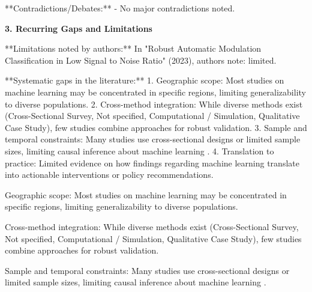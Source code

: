 \documentclass[11pt,a4paper]{article}
\begin{document}
**Contradictions/Debates:**
- No major contradictions noted.

\vspace{1em}


\textbf{\large 3. Recurring Gaps and Limitations}\par\vspace{0.5em}

**Limitations noted by authors:**
In "Robust Automatic Modulation Classification in Low Signal to Noise Ratio" (2023), authors note: limited.

**Systematic gaps in the literature:**
1. Geographic scope: Most studies on machine learning  may be concentrated in specific regions, limiting generalizability to diverse populations.
2. Cross-method integration: While diverse methods exist (Cross-Sectional Survey, Not specified, Computational / Simulation, Qualitative Case Study), few studies combine approaches for robust validation.
3. Sample and temporal constraints: Many studies use cross-sectional designs or limited sample sizes, limiting causal inference about machine learning .
4. Translation to practice: Limited evidence on how findings regarding machine learning  translate into actionable interventions or policy recommendations.

\vspace{0.5em}


\begin{gapbox}[Gap 1]
Geographic scope: Most studies on machine learning  may be concentrated in specific regions, limiting generalizability to diverse populations.
\end{gapbox}

\vspace{0.3em}


\begin{gapbox}[Gap 2]
Cross-method integration: While diverse methods exist (Cross-Sectional Survey, Not specified, Computational / Simulation, Qualitative Case Study), few studies combine approaches for robust validation.
\end{gapbox}

\vspace{0.3em}


\begin{gapbox}[Gap 3]
Sample and temporal constraints: Many studies use cross-sectional designs or limited sample sizes, limiting causal inference about machine learning .
\end{gapbox}

\vspace{0.3em}
\end{document}
